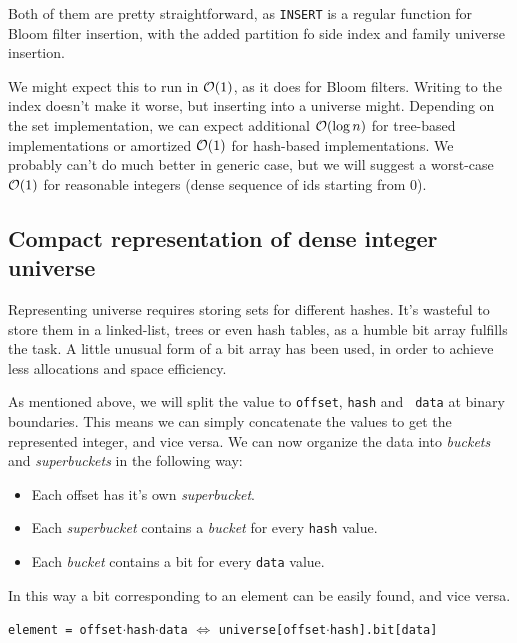 Both of them are pretty straightforward, as {\tt INSERT} is a regular function
for Bloom filter insertion, with the added partition fo side index and family
universe insertion.

We might expect this to run in $\mathcal{O}(1)$, as it does for Bloom filters. Writing to
the index doesn't make it worse, but inserting into a universe might. Depending
on the set implementation, we can expect additional $\mathcal{O}(\log n)$ for tree-based
implementations or amortized $\mathcal{O}(1)$ for hash-based implementations. We probably
can't do much better in generic case, but we will suggest a worst-case $\mathcal{O}(1)$
for reasonable integers (dense sequence of ids starting from 0).


\subsection{Compact representation of dense integer universe}

Representing universe requires storing sets for different hashes. It's wasteful
to store them in a linked-list, trees or even hash tables, as a humble bit array
fulfills the task. A little unusual form of a bit array has been used, in order
to achieve less allocations and space efficiency.

As mentioned above, we will split the value to {\tt offset}, {\tt hash} and {\tt
data} at binary boundaries. This means we can simply concatenate the values to
get the represented integer, and vice versa. We can now organize the data into
{\it buckets} and {\it superbuckets} in the following way:

\begin{itemize}
	\item Each offset has it's own {\it superbucket}.
	\item Each {\it superbucket} contains a {\it bucket} for every {\tt hash} value.
	\item Each {\it bucket} contains a bit for every {\tt data} value.
\end{itemize}

In this way a bit corresponding to an element can be easily found, and vice
versa.

\begin{center}
	{\tt element = offset$\cdot$hash$\cdot$data} $\Leftrightarrow$
	{\tt universe[offset$\cdot$hash].bit[data]}
\end{center}


